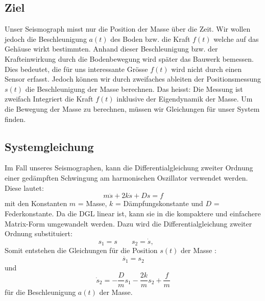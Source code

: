 \subsection{Ziel}
Unser Seismograph misst nur die Position der Masse über die Zeit. 
Wir wollen jedoch die Beschleunigung $a(t)$ des Boden bzw. die Kraft $f(t)$ welche auf das Gehäuse wirkt bestimmten.  
Anhand dieser Beschleunigung bzw. der Krafteinwirkung durch die Bodenbewegung wird später das Bauwerk bemessen.
Dies bedeutet, die für uns interessante Grösse $f(t)$ wird nicht durch einen Sensor erfasst. 
Jedoch können wir durch zweifaches ableiten der Positionsmessung $s(t)$ die Beschleunigung der Masse berechnen. 
Das heisst: Die Messung ist zweifach Integriert die Kraft $f(t)$ inklusive der Eigendynamik der Masse.
Um die Bewegung der Masse zu berechnen, müssen wir Gleichungen für unser System finden.

\subsection{Systemgleichung}
Im Fall unseres Seismographen, kann die Differentialgleichung zweiter Ordnung einer gedämpften Schwingung am harmonischen Oszillator verwendet werden. 
Diese lautet:
\begin{equation}
m\ddot s + 2k \dot s + Ds = f
\end{equation}
mit den Konstanten $m$ = Masse, $k$ = Dämpfungskonstante und $D$  = Federkonstante.
Da die DGL linear ist, kann sie in die kompaktere und einfachere Matrix-Form umgewandelt werden. Dazu wird die Differentialgleichung zweiter Ordnung substituiert:
\[ {s_1}=s \qquad
{s_2}=\dot s,  \qquad\]
Somit entstehen die Gleichungen für die Position $s(t)$ der Masse :
\[ \dot {s_1} = {s_2}\] 
und
\[ \dot s_2 = -\frac{D}{m} {s_1} -\frac{2k}{m} {s_2} + \frac{f} {m} \] für die Beschleunigung $a(t)$ der Masse.

